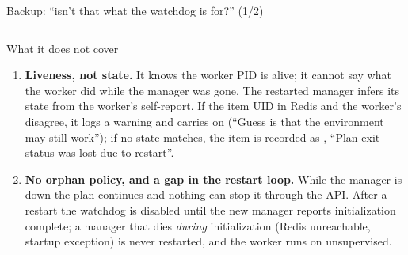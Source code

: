 \begin{frame}{Backup: ``isn't that what the watchdog is for?'' (1/2)}
\begin{columns}[T]
\begin{column}{0.56\textwidth}
\begin{alertblock}{What it does not cover}
\begin{enumerate}
                          (reboot, OOM, upgrade, ) its exit handlers kill the worker
                          and the manager. It survives the manager, not the host, so a fail-closed path is
                          needed anyway; the watchdog is a \emph{second} path for one failure class.
                    \item \textbf{Liveness, not state.} It knows the worker PID is alive; it cannot say what
                          the worker did while the manager was gone. The restarted manager infers its state
                          from the worker's self-report. If the item UID in Redis and the worker's disagree,
                          it logs a warning and carries on (``Guess is that the environment may still work'');
                          if no state matches, the item is recorded as ,
                          ``Plan exit status was lost due to restart''. 
                    \item \textbf{No orphan policy, and a gap in the restart loop.} While the manager is down
                          the plan continues and nothing can stop it through the API. After a restart the
                          watchdog is disabled until the new manager reports initialization complete; a manager
                          that dies \emph{during} initialization (Redis unreachable, startup exception) is never
                          restarted, and the worker runs on unsupervised.
                \end{enumerate}
            \end{alertblock}
        \end{column}
    \end{columns}
\end{frame}

